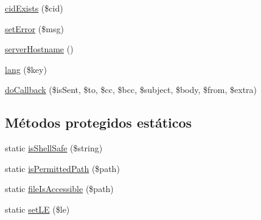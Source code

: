 \begin{DoxyCompactItemize}
\hyperlink{classPHPMailer_1_1PHPMailer_1_1PHPMailer_af58663403fba47a8d3d8aa3628264885}{cid\+Exists} (\$cid)
\item 
\hyperlink{classPHPMailer_1_1PHPMailer_1_1PHPMailer_ab9ceb1c882037ec7e3874f9f805ffa6e}{set\+Error} (\$msg)
\item 
\hyperlink{classPHPMailer_1_1PHPMailer_1_1PHPMailer_a217fac6bb89f12f2cafea42f12e8f853}{server\+Hostname} ()
\item 
\hyperlink{classPHPMailer_1_1PHPMailer_1_1PHPMailer_a3acee11d1ea952f5926356da4cd01aa1}{lang} (\$key)
\item 
\hyperlink{classPHPMailer_1_1PHPMailer_1_1PHPMailer_a0d502e3da4dec7763b468426c11ddfff}{do\+Callback} (\$is\+Sent, \$to, \$cc, \$bcc, \$subject, \$body, \$from, \$extra)
\end{DoxyCompactItemize}
\subsection*{Métodos protegidos estáticos}
\begin{DoxyCompactItemize}
\item 
static \hyperlink{classPHPMailer_1_1PHPMailer_1_1PHPMailer_a2dea4de035a3f823cb341c8488dffe75}{is\+Shell\+Safe} (\$string)
\item 
static \hyperlink{classPHPMailer_1_1PHPMailer_1_1PHPMailer_a70915efb9c7554c42158fa7aac3cc4dd}{is\+Permitted\+Path} (\$path)
\item 
static \hyperlink{classPHPMailer_1_1PHPMailer_1_1PHPMailer_ac9caa2108f578941abcecbbf08382159}{file\+Is\+Accessible} (\$path)
\item 
static \hyperlink{classPHPMailer_1_1PHPMailer_1_1PHPMailer_a7680864ffe28f6fb3349ab63e885c38b}{set\+LE} (\$le)
\end{DoxyCompactItemize}

